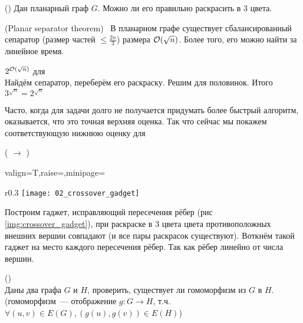 \begin{problem}()
   Дан планарный граф $G$. Можно ли его правильно раскрасить в 3 цвета.
\end{problem}

\begin{fact}(Planar separator theorem)~\cite{Lipton1979}
    В планарном графе существует сбалансированный сепаратор (размер частей $\le \frac{2n}{3}$) размера $\mathcal{O}(\sqrt{n})$. Более того, его можно найти за линейное время.
\end{fact}

\begin{algorithm}{$2^{\mathcal{O}(\sqrt{n})}$ для }\\
    Найдём сепаратор, переберём его раскраску. Решим  для половинок. Итого $3^{\sqrt{n}} = 2^{\sqrt n}$
\end{algorithm}

\begin{remark}
    Часто, когда для задачи долго не получается придумать более быстрый алгоритм, оказывается, что это точная верхняя оценка. Так что сейчас мы покажем соответствующую нижнюю оценку для 
\end{remark}

\begin{reduction}( $\to$ )

  \begin{adjustbox}{valign=T,raise=\strutheight,minipage={\linewidth}}
    \begin{wrapfigure}{r}{0.3\linewidth}
      \centering
      \vspace{-2.5em}
      \texttt{[image: 02\_crossover\_gadget]}
      \caption{Crossover gadget.}
      \label{img:crossover_gadget}
    \end{wrapfigure}

  \strut{}

  Построим гаджет, исправляющий пересечения рёбер (рис \ref{img:crossover_gadget}), при раскраске в 3 цвета цвета противоположных внешних вершин совпадают (и все пары раскрасок существуют). Воткнём такой гаджет на место каждого пересечения рёбер. Так как рёбер линейно от числа вершин.

\end{adjustbox} 

\end{reduction}

\begin{problem}()\\
    Даны два графа $G$ и $H$, проверить, существует ли гомоморфизм из $G$ в $H$. 
    (гомоморфизм~--- отображение $g\colon G \to H$, т.ч. $\forall (u, v) \in E(G), (g(u), g(v)) \in E(H)$)\\

\end{problem}


